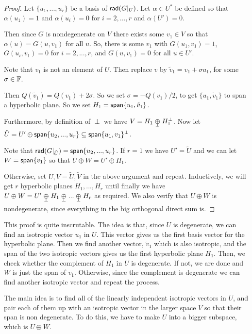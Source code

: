 \begin{proof}
    Let $\{u_1,...,u_r\}$ be a basis of $\operatorname{\textsf{rad}}(G|_U)$. Let $\alpha \in U^*$ be defined so that $\alpha(u_1)=1$ and $\alpha(u_i)=0$ for $i=2,...,r$ and $\alpha(U')=0$. 
    
    Then since $G$ is nondegenerate on $V$ there exists some $v_1 \in V$ so that $\alpha(u)=G(u,v_1)$ for all $u$. So, there is some $v_1$ with $G(u_1,v_1)=1$, $G(u_i,v_1)=0$ for $i=2,...,r$, and $G(u,v_1)=0$ for all $u\in U'$. 
    
    Note that $v_1$ is not an element of $U$. Then replace $v$ by $\tilde{v}_1 = v_1+\sigma u_1$, for some $\sigma \in \operatorname{\mathbb{F}}$. 
    
    Then $Q(\tilde{v}_1) = Q(v_1)+2\sigma$. So we set $\sigma = -Q(v_1)/2$, to get $\{u_1,\tilde{v}_1\}$ to span a hyperbolic plane. So we set 
    $H_1 = \operatorname{\textsf{span}}\{u_1,\tilde{v}_1\}$.
    
    Furthermore, by definition of $\perp$ we have $V = H_1\orthoplus H_1^\perp$. Now let $\tilde{U} = U' \oplus \operatorname{\textsf{span}}\{u_2,...,u_r\}\subseteq \operatorname{\textsf{span}}\{u_1,v_1\}^\perp$.
    
    Note that $\operatorname{\textsf{rad}}(G|_{\tilde{U}}) = \operatorname{\textsf{span}}\{u_2,...,u_r\}$. If $r=1$ we have $U' = \tilde{U}$ and we can let $W = \operatorname{\textsf{span}}\{v_1\}$ so that $U\oplus W = U' \oplus H_1$. 
    
    Otherwise, set $U,V = \tilde{U},\tilde{V}$ in the above argument and repeat. Inductively, we will get $r$ hyperbolic planes $H_1,...,H_r$ until finally we have $U\oplus W = U' \orthoplus H_1\orthoplus...\orthoplus H_r$ as required. We also verify that $U\oplus W$ is nondegenerate, since everything in the big orthogonal direct sum is.  
\end{proof}
\begin{remark*}
    This proof is quite inscrutable. The idea is that, since $U$ is degenerate, we can find an isotropic vector $u_1$ in $U$. This vector gives us the first basis vector for the hyperbolic plane. Then we find another vector, $\tilde{v}_1$ which is also isotropic, and the span of the two isotropic vectors gives us the first hyperbolic plane $H_1$. Then, we check whether the complement of $H_1$ in $U$ is degenerate. If not, we are done and $W$ is just the span of $v_1$. Otherwise, since the complement is degenerate we can find another isotropic vector and repeat the process.

    The main idea is to find all of the linearly independent isotropic vectors in $U$, and pair each of them up with an isotropic vector in the larger space $V$ so that their span is non degenerate. To do this, we have to make $U$ into a bigger subspace, which is $U\oplus W$.
\end{remark*}

